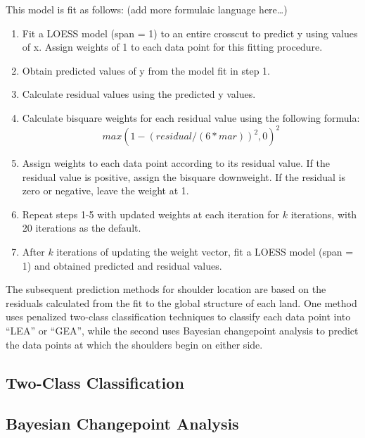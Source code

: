 \documentclass[12pt]{article}
\providecommand{\tightlist}{%
  \setlength{\itemsep}{0pt}\setlength{\parskip}{0pt}}
\begin{document}
This model is fit as follows: (add more formulaic language here\ldots{})

\begin{enumerate}
\def\labelenumi{\arabic{enumi}.}
\tightlist
\item
  Fit a LOESS model (span = 1) to an entire crosscut to predict y using
  values of x. Assign weights of 1 to each data point for this fitting
  procedure.\\
\item
  Obtain predicted values of y from the model fit in step 1.\\
\item
  Calculate residual values using the predicted y values.\\
\item
  Calculate bisquare weights for each residual value using the following
  formula:\\
  \[max(1 - (residual/(6*mar))^2, 0)^2\]
\item
  Assign weights to each data point according to its residual value. If
  the residual value is positive, assign the bisquare downweight. If the
  residual is zero or negative, leave the weight at 1.\\
\item
  Repeat steps 1-5 with updated weights at each iteration for \(k\)
  iterations, with 20 iterations as the default.\\
\item
  After \(k\) iterations of updating the weight vector, fit a LOESS
  model (span = 1) and obtained predicted and residual values.
\end{enumerate}

The subsequent prediction methods for shoulder location are based on the
residuals calculated from the fit to the global structure of each land.
One method uses penalized two-class classification techniques to
classify each data point into ``LEA'' or ``GEA'', while the second uses
Bayesian changepoint analysis to predict the data points at which the
shoulders begin on either side.

\subsection{Two-Class Classification}

\subsection{Bayesian Changepoint Analysis}
\end{document}
